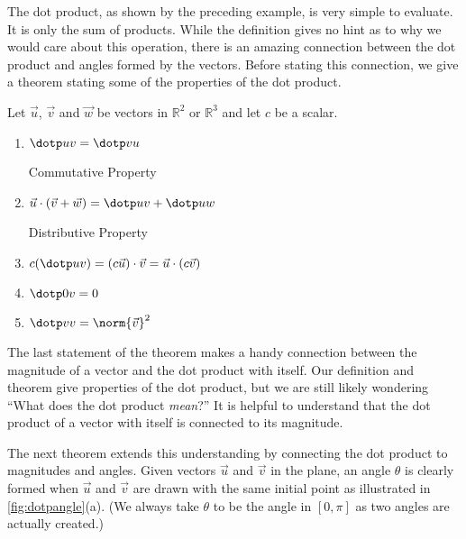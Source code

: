 The dot product, as shown by the preceding example, is very simple to evaluate. It is only the sum of products. While the definition gives no hint as to why we would care about this operation, there is an amazing connection between the dot product and angles formed by the vectors. Before stating this connection, we give a theorem stating some of the properties of the dot product.

\begin{theorem}\label{thm:dot_product_properties}
Let $\vec u$, $\vec v$ and $\vec w$ be vectors in $\mathbb{R}^2$ or $\mathbb{R}^3$ and let $c$ be a scalar.
\begin{enumerate}
	\item \parbox{150pt}{$\dotp uv = \dotp vu$}{Commutative Property}
	\item \parbox{150pt}{$\vec u\cdot(\vec v+\vec w) = \dotp uv + \dotp uw$}{Distributive Property}
	\item	$c(\dotp uv) = (c\vec u)\cdot \vec v = \vec u \cdot (c\vec v)$
	\item	$\dotp 0v = 0$
	\item	$\dotp vv=\norm{\vec v}^2 $
\end{enumerate}
\end{theorem}

The last statement of the theorem makes a handy connection between the magnitude of a vector and the dot product with itself. Our definition and theorem give properties of the dot product, but we are still likely wondering ``What does the dot product \emph{mean}?'' It is helpful to understand that the dot product of a vector with itself is connected to its magnitude.

The next theorem extends this understanding by connecting the dot product to magnitudes and angles. Given vectors $\vec u$ and $\vec v$ in the plane, an angle $\theta$ is clearly formed when $\vec u$ and $\vec v$ are drawn with the same initial point as illustrated in \autoref{fig:dotpangle}(a). (We always take $\theta$ to be the angle in $[0,\pi]$ as two angles are actually created.) 


